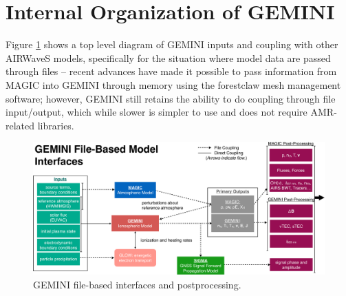 \documentclass[11pt,letterpaper]{article}
\begin{document}
\section{Internal Organization of GEMINI}

Figure \ref{fig:org} shows a top level diagram of GEMINI inputs and coupling with other AIRWaveS models, specifically for the situation where model data are passed through files -- recent advances have made it possible to pass information from MAGIC into GEMINI through memory using the forestclaw mesh management software; however, GEMINI still retains the ability to do coupling through file input/output, which while slower is simpler to use and does not require AMR-related libraries.  
\begin{figure}
  \centering
  \includegraphics[width=\textwidth]{./figures/GEMINI_org-crop.pdf}
  \caption{GEMINI file-based interfaces and postprocessing.} \label{fig:org}
\end{figure}
\end{document}
